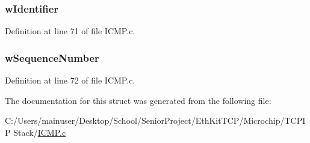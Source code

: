 \hypertarget{struct_i_c_m_p___p_a_c_k_e_t_a080ff6e97e0202c75a71a9b6ffe7abc7}{}
\subsubsection[{w\+Identifier}]{ w\+Identifier}\label{struct_i_c_m_p___p_a_c_k_e_t_a080ff6e97e0202c75a71a9b6ffe7abc7}


Definition at line 71 of file I\+C\+M\+P.\+c.

\hypertarget{struct_i_c_m_p___p_a_c_k_e_t_ab5b9f6edb6e4c1fb9986f4ce69641367}{}
\subsubsection[{w\+Sequence\+Number}]{ w\+Sequence\+Number}\label{struct_i_c_m_p___p_a_c_k_e_t_ab5b9f6edb6e4c1fb9986f4ce69641367}


Definition at line 72 of file I\+C\+M\+P.\+c.



The documentation for this struct was generated from the following file\+:\begin{DoxyCompactItemize}
\item 
C\+:/\+Users/mainuser/\+Desktop/\+School/\+Senior\+Project/\+Eth\+Kit\+T\+C\+P/\+Microchip/\+T\+C\+P\+I\+P Stack/\hyperlink{_i_c_m_p_8c}{I\+C\+M\+P.\+c}\end{DoxyCompactItemize}
